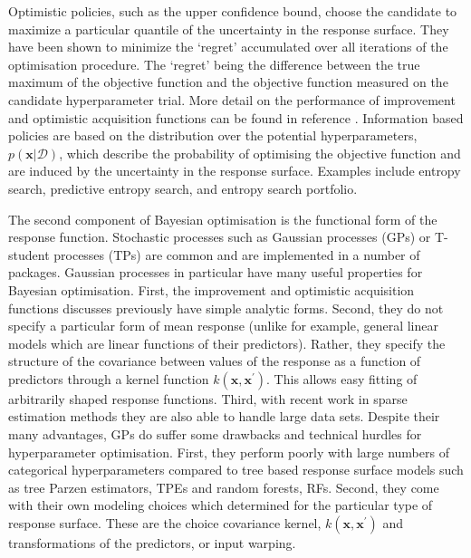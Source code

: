 Optimistic policies, such as the upper confidence bound\cite{icml2010_129}, choose the candidate to maximize a particular quantile of the uncertainty in the response surface. They have been shown to minimize the `regret' accumulated over all iterations of the optimisation procedure\cite{icml2010_129}. The `regret' being the difference between the true maximum of the objective function and the objective function measured on the candidate hyperparameter trial\cite{berger2013statistical}. More detail on the performance of improvement and optimistic acquisition functions can be found in reference \cite{jones2001taxonomy}. Information based policies are based on the distribution over the potential hyperparameters, $p(\mathbf{x}|\mathcal{D})$, which describe the probability of optimising the objective function and are induced by the uncertainty in the response surface\cite{shahriariTakingHumanOut2016}. Examples include entropy search\cite{hennig2012entropy}, predictive entropy search\cite{hernandez2014predictive}, and entropy search portfolio\cite{shahriariEntropySearchPortfolio2015}. 

The second component of Bayesian optimisation is the functional form of the response function. Stochastic processes such as Gaussian processes (GPs) or T-student processes (TPs)\cite{rasmussenGaussianProcessesMachine2006} are common and are implemented in a number of packages\cite{martinez-cantinBayesOptBayesianOptimization2014,NIPS2012_4522,gpyopt2016,JMLR:v21:18-223,mcgibbonOspreyHyperparameterOptimization2016a,liuAuptimizerExtensibleOpenSource2019}. Gaussian processes in particular have many useful properties for Bayesian optimisation\cite{feurer2019hyperparameter,brochuTutorialBayesianOptimization2010,jonesEfficientGlobalOptimization1998}.  First, the improvement and optimistic acquisition functions discusses previously have simple analytic forms\cite{brochuTutorialBayesianOptimization2010}. Second, they do not specify a particular form of mean response (unlike for example, general linear models which are linear functions of their predictors\cite{dobson2018introduction}). Rather, they specify the structure of the covariance between values of the response as a function of predictors through a kernel function $k(\mathbf{x}, \mathbf{x}^{\prime})$\cite{rasmussenGaussianProcessesMachine2006}. This allows easy fitting of arbitrarily shaped response functions.  Third, with recent work in sparse estimation methods they are also able to handle large data sets\cite{quinonero-candelaUnifyingViewSparse2005}. Despite their many advantages, GPs do suffer some drawbacks and technical hurdles for hyperparameter optimisation. First, they perform poorly with large numbers of categorical hyperparameters\cite{eggensperger2013towards} compared to tree based response surface models such as tree Parzen estimators, TPEs\cite{bergstraAlgorithmsHyperParameterOptimizationa} and random forests, RFs\cite{hutterSequentialModelbasedOptimization2011,breiman2001}.  Second, they come with their own modeling choices which determined for the particular type of response surface\cite{rasmussenGaussianProcessesMachine2006}.  These are the choice covariance kernel, $k(\mathbf{x}, \mathbf{x}^{\prime})$ and transformations of the predictors, or input warping\cite{snoekInputWarpingBayesian2014a}. 

